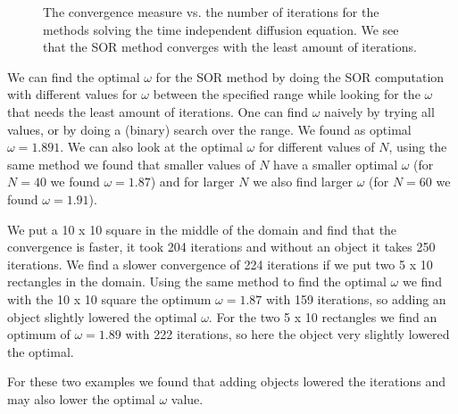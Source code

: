 \documentclass[a4paper]{article}
\begin{document}
\begin{figure}
\caption{The convergence measure vs. the number of iterations for the methods solving the time independent diffusion equation. We see that the SOR method converges with the least amount of iterations.}
\label{fig:conv}
\end{figure}

We can find the optimal $\omega$ for the SOR method by doing the SOR computation with different values for $\omega$ between the specified range while looking for the $\omega$ that needs the least amount of iterations. One can find $\omega$ naively by trying all values, or by doing a (binary) search over the range. We found as optimal $\omega = 1.891$. We can also look at the optimal $\omega$ for different values of $N$, using the same method we found that smaller values of $N$ have a smaller optimal $\omega$ (for $N=40$ we found $\omega=1.87$) and for larger $N$ we also find larger $\omega$ (for $N=60$ we found $\omega=1.91$).

We put a 10 x 10 square in the middle of the domain and find that the convergence is faster, it took 204 iterations and without an object it takes 250 iterations. We find a slower convergence of 224 iterations if we put two 5 x 10 rectangles in the domain. Using the same method to find the optimal $\omega$ we find with the 10 x 10 square the optimum $\omega=1.87$ with 159 iterations, so adding an object slightly lowered the optimal $\omega$. For the two 5 x 10 rectangles we find an optimum of $\omega=1.89$ with 222 iterations, so here the object very slightly lowered the optimal.

For these two examples we found that adding objects lowered the iterations and may also lower the optimal $\omega$ value.



\end{document}

